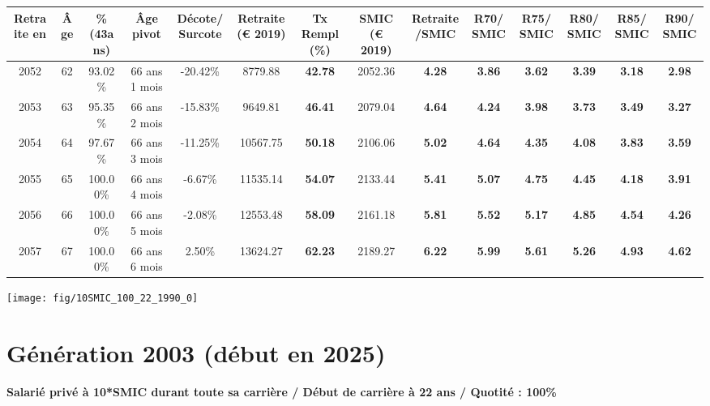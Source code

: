 \begin{adjustbox}{max width=\textwidth} 
\begin{tabular}[htb]{|c|c||c|c|c||c|c||c|c||c|c|c|c|c|} 
\hline 
 Retraite en &  Âge &  \%(43ans) &  Âge pivot &  Décote/Surcote &  Retraite (\euro{} 2019) &  Tx Rempl(\%) &  SMIC (\euro{} 2019) &  Retraite/SMIC &  R70/SMIC &  R75/SMIC &  R80/SMIC &  R85/SMIC &  R90/SMIC \\ 
\hline \hline 
 2052 &  62 &  93.02\% &  66 ans 1 mois &  -20.42\% &  8779.88 &  {\bf 42.78} &  2052.36 &  {\bf 4.28} &  {\bf 3.86} &  {\bf 3.62} &  {\bf 3.39} &  {\bf 3.18} &  {\bf 2.98} \\ 
\hline 
 2053 &  63 &  95.35\% &  66 ans 2 mois &  -15.83\% &  9649.81 &  {\bf 46.41} &  2079.04 &  {\bf 4.64} &  {\bf 4.24} &  {\bf 3.98} &  {\bf 3.73} &  {\bf 3.49} &  {\bf 3.27} \\ 
\hline 
 2054 &  64 &  97.67\% &  66 ans 3 mois &  -11.25\% &  10567.75 &  {\bf 50.18} &  2106.06 &  {\bf 5.02} &  {\bf 4.64} &  {\bf 4.35} &  {\bf 4.08} &  {\bf 3.83} &  {\bf 3.59} \\ 
\hline 
 2055 &  65 &  100.00\% &  66 ans 4 mois &  -6.67\% &  11535.14 &  {\bf 54.07} &  2133.44 &  {\bf 5.41} &  {\bf 5.07} &  {\bf 4.75} &  {\bf 4.45} &  {\bf 4.18} &  {\bf 3.91} \\ 
\hline 
 2056 &  66 &  100.00\% &  66 ans 5 mois &  -2.08\% &  12553.48 &  {\bf 58.09} &  2161.18 &  {\bf 5.81} &  {\bf 5.52} &  {\bf 5.17} &  {\bf 4.85} &  {\bf 4.54} &  {\bf 4.26} \\ 
\hline 
 2057 &  67 &  100.00\% &  66 ans 6 mois &  2.50\% &  13624.27 &  {\bf 62.23} &  2189.27 &  {\bf 6.22} &  {\bf 5.99} &  {\bf 5.61} &  {\bf 5.26} &  {\bf 4.93} &  {\bf 4.62} \\ 
\hline 
\hline 
\end{tabular} 
\end{adjustbox} 
 
 \vspace{0.1cm} 

 {\hspace{-2.2cm}\texttt{[image: fig/10SMIC\_100\_22\_1990\_0]}} 

\newpage 
 
\section{Génération 2003 (début en 2025)\label{10SMIC_100_22_2003_0}} 
 
{\bf \noindent Salarié privé à 10*SMIC durant toute sa carrière / Début de carrière à 22 ans / Quotité : 100\%}  ~ 

